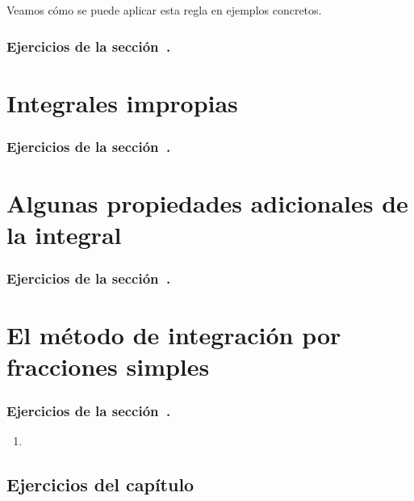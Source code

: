 Veamos cómo se puede aplicar esta regla en ejemplos concretos.

\begin{example}
  
\end{example}

\subsubsection*{Ejercicios de la sección~.}

\begin{enumerate}
  
\end{enumerate}  



\section{Integrales impropias}


\subsubsection*{Ejercicios de la sección~.}

\begin{enumerate}
  
\end{enumerate}


\section{Algunas propiedades adicionales de la integral}


\subsubsection*{Ejercicios de la sección~.}

\begin{enumerate}
  
\end{enumerate}


\section{El método de integración por fracciones simples}


\subsubsection*{Ejercicios de la sección~.}

\begin{enumerate}
\item 
\end{enumerate}



\subsection*{Ejercicios del capítulo~}



